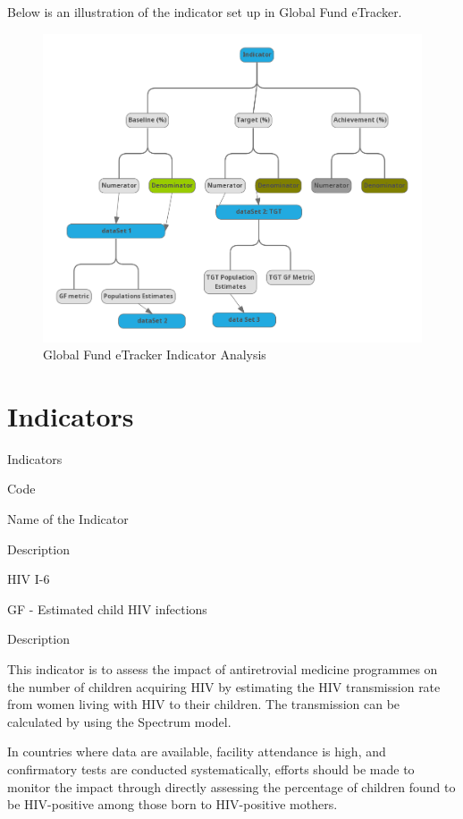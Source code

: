 \documentclass[]{book}
\begin{document}
Below is an illustration of the indicator set up in Global Fund eTracker.

\begin{figure}

{\centering \includegraphics[width=0.8\linewidth]{./images/indicators} 

}

\caption{Global Fund eTracker Indicator Analysis}\label{fig:unnamed-chunk-2}
\end{figure}

\hypertarget{indicators}{%
\section{Indicators}\label{indicators}}

\label{tab:unnamed-chunk-3}Indicators

Code

Name of the Indicator

Description

HIV I-6

GF - Estimated child HIV infections

Description

This indicator is to assess the impact of antiretrovial medicine programmes on the number of children acquiring HIV by estimating the HIV transmission rate from women living with HIV to their children. The transmission can be calculated by using the Spectrum model.

In countries where data are available, facility attendance is high, and confirmatory tests are conducted systematically, efforts should be made to monitor the impact through directly assessing the percentage of children found to be HIV-positive among those born to HIV-positive mothers.
\end{document}
